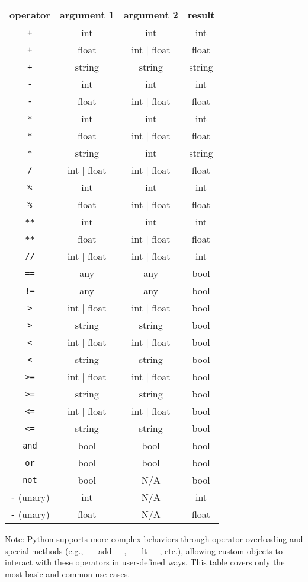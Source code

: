 \begin{center}
\begin{tabular}{c|c|c|c}
\textbf{operator} & \textbf{argument 1} & \textbf{argument 2} & \textbf{result} \\ \hline 
\texttt{+} & int & int & int \\
\texttt{+} & float & int | float & float \\
\texttt{+} & string & string & string \\
\texttt{-} & int & int & int \\
\texttt{-} & float & int | float & float \\
\texttt{*} & int & int & int \\
\texttt{*} & float & int | float & float \\
\texttt{*} & string & int & string \\
\texttt{/} & int | float & int | float & float \\
\texttt{\%} & int & int & int \\
\texttt{\%} & float & int | float & float \\
\texttt{**} & int & int & int \\
\texttt{**} & float & int | float & float \\
\texttt{//} & int | float & int | float & int \\
\texttt{==} & any & any & bool \\
\texttt{!=} & any & any & bool \\
\texttt{>} & int | float & int | float & bool \\
\texttt{>} & string & string & bool \\
\texttt{<} & int | float & int | float & bool \\
\texttt{<} & string & string & bool \\
\texttt{>=} & int | float & int | float & bool \\
\texttt{>=} & string & string & bool \\
\texttt{<=} & int | float & int | float & bool \\
\texttt{<=} & string & string & bool \\
\texttt{and} & bool & bool & bool \\
\texttt{or} & bool & bool & bool \\
\texttt{not} & bool & N/A & bool \\
\texttt{-} (unary) & int & N/A & int \\
\texttt{-} (unary) & float & N/A & float \\
\end{tabular}
\end{center}

Note: Python supports more complex behaviors through operator overloading and special methods (e.g., \_\_add\_\_, \_\_lt\_\_, etc.), allowing custom objects to interact with these operators in user-defined ways. This table covers only the most basic and common use cases.